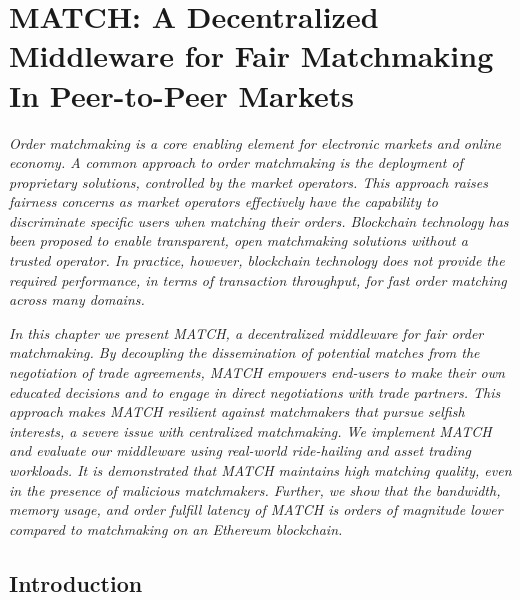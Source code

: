 \chapter{MATCH: A Decentralized Middleware for Fair Matchmaking In Peer-to-Peer Markets}
\label{chapter:match}

\emph{
	Order matchmaking is a core enabling element for electronic markets and online economy.
	A common approach to order matchmaking is the deployment of proprietary solutions, controlled by the market operators.
	This approach raises fairness concerns as market operators effectively have the capability to discriminate specific users when matching their orders.
	Blockchain technology has been proposed to enable transparent, open matchmaking solutions without a trusted operator.
	In practice, however, blockchain technology does not provide the required performance, in terms of transaction throughput, for fast order matching across many domains. }
	
\emph{
	In this chapter we present MATCH, a decentralized middleware for fair order matchmaking.
	By decoupling the dissemination of potential matches from the negotiation of trade agreements, MATCH empowers end-users to make their own educated decisions and to engage in direct negotiations with trade partners.
	This approach makes MATCH resilient against matchmakers that pursue selfish interests, a severe issue with centralized matchmaking.
	We implement MATCH and evaluate our middleware using real-world ride-hailing and asset trading workloads.
	It is demonstrated that MATCH maintains high matching quality, even in the presence of malicious matchmakers.
	Further, we show that the bandwidth, memory usage, and order fulfill latency of MATCH is orders of magnitude lower compared to matchmaking on an Ethereum blockchain. }

\newpage

\section{Introduction}
\label{sec:introduction}

